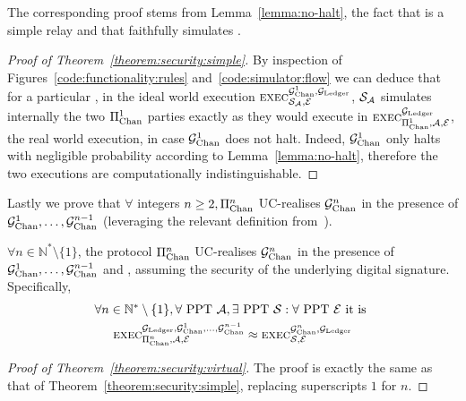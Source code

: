   The corresponding proof stems from
  Lemma~\ref{lemma:no-halt}, the fact that \fchan is a simple relay and that
  \simulator faithfully simulates \pchan.

\begin{proof}[Proof of Theorem~\ref{theorem:security:simple}]
  By inspection of Figures~\ref{code:functionality:rules}
  and~\ref{code:simulator:flow} we can deduce that for a particular
  \environment, in the ideal world execution $\textsc{exec}^{\mathcal{G}_{\mathrm{Chan}}^{1},
  \mathcal{G}_{\mathrm{Ledger}}}_{\mathcal{S}_{\mathcal{A}}, \mathcal{E}}$, $\mathcal{S}_{\mathcal{A}}$
  simulates internally the two $\Pi_{\mathrm{Chan}}^{1}$ parties exactly as they would execute in
  $\textsc{exec}^{\mathcal{G}_{\mathrm{Ledger}}}_{\Pi_{\mathrm{Chan}}^{1}, \mathcal{A}, \mathcal{E}}$, the real world
  execution, in case $\mathcal{G}_{\mathrm{Chan}}^{1}$ does not halt. Indeed, $\mathcal{G}_{\mathrm{Chan}}^{1}$ only halts with
  negligible probability according to Lemma~\ref{lemma:no-halt}, therefore the
  two executions are computationally indistinguishable.
\end{proof}

  Lastly we prove that $\forall$ integers $n \geq 2, \Pi_{\mathrm{Chan}}^{n}$ UC-realises
  $\mathcal{G}_{\mathrm{Chan}}^{n}$ in the presence of $\mathcal{G}_{\mathrm{Chan}}^{1}, \dots, \mathcal{G}_{\mathrm{Chan}}^{n-1}$
  (leveraging the relevant definition
  from~\cite{DBLP:conf/tcc/BadertscherCHTZ20}).

\begin{theorem}
  \label{theorem:security:virtual}
  $\forall n \in \mathbb{N}^* \setminus \{1\}$, the protocol $\Pi_{\mathrm{Chan}}^{n}$
  UC-realises $\mathcal{G}_{\mathrm{Chan}}^{n}$ in the presence of $\mathcal{G}_{\mathrm{Chan}}^{1}, \dots,
  \mathcal{G}_{\mathrm{Chan}}^{n-1}$ and \ledger, assuming the security of the underlying digital
  signature. Specifically,
  \begin{gather*}
    \forall n \in \mathbb{N}^* \setminus \{1\}, \forall \text{ PPT } \mathcal{A},
    \exists \text{ PPT } \mathcal{S}: \forall \text{ PPT } \mathcal{E} \text{ it
    is } \\
    \textsc{exec}^{\mathcal{G}_{\mathrm{Ledger}}, \mathcal{G}_{\mathrm{Chan}}^{1}, \dots, \mathcal{G}_{\mathrm{Chan}}^{n-1}}_{\Pi_{\mathrm{Chan}}^{n},
    \mathcal{A}, \mathcal{E}} \approx
    \textsc{exec}^{\mathcal{G}_{\mathrm{Chan}}^{n}, \mathcal{G}_{\mathrm{Ledger}}}_{\mathcal{S}, \mathcal{E}}
  \end{gather*}
\end{theorem}

\begin{proof}[Proof of Theorem~\ref{theorem:security:virtual}]
  The proof is exactly the same as that of
  Theorem~\ref{theorem:security:simple}, replacing superscripts $1$ for $n$.
\end{proof}
